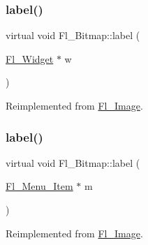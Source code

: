 \mbox{\label{class_fl___bitmap_af17e00fe7cc3909a0ad8910dc71aee5f}} 
\subsubsection{\texorpdfstring{label()}{label()}\hspace{0.1cm}{\footnotesize\ttfamily [1/2]}}
{\footnotesize\ttfamily virtual void Fl\+\_\+\+Bitmap\+::label (\begin{DoxyParamCaption}\item[{\hyperlink{class_fl___widget}{Fl\+\_\+\+Widget} $\ast$}]{w }\end{DoxyParamCaption})\hspace{0.3cm}{\ttfamily [virtual]}}



Reimplemented from \hyperlink{class_fl___image_aff8c4d2f915bbf1fcbcfd5ed27320c79}{Fl\+\_\+\+Image}.

\mbox{\label{class_fl___bitmap_a8d35f1528e46fc3447618d5534e7e428}} 
\subsubsection{\texorpdfstring{label()}{label()}\hspace{0.1cm}{\footnotesize\ttfamily [2/2]}}
{\footnotesize\ttfamily virtual void Fl\+\_\+\+Bitmap\+::label (\begin{DoxyParamCaption}\item[{\hyperlink{struct_fl___menu___item}{Fl\+\_\+\+Menu\+\_\+\+Item} $\ast$}]{m }\end{DoxyParamCaption})\hspace{0.3cm}{\ttfamily [virtual]}}



Reimplemented from \hyperlink{class_fl___image_a9732d7bafcbe201a570ee465833eee67}{Fl\+\_\+\+Image}.

\mbox{\label{class_fl___bitmap_abdf30ee205258d5ce5ca17823705c813}} 
